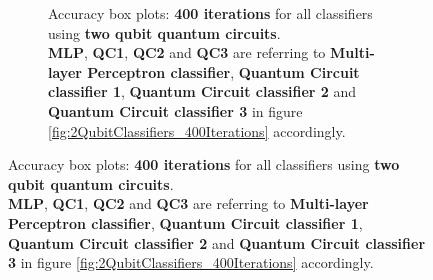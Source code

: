 \begin{figure}[!h]
\begin{subfigure}{1.0\textwidth}
\begin{subfigure}{1.0\textwidth}
{            }
        \end{subfigure}
        \begin{subfigure}{1.0\textwidth}
            \centering
        \end{subfigure}
        \begin{subfigure}{1.0\textwidth}
            \centering
        \end{subfigure}
        \caption{Accuracy box plots: \textbf{400 iterations} for all classifiers using \textbf{two qubit quantum circuits}.\\ \textbf{MLP}, \textbf{QC1}, \textbf{QC2} and \textbf{QC3} are referring to \textbf{Multi-layer Perceptron classifier}, \textbf{Quantum Circuit classifier 1}, \textbf{Quantum Circuit classifier 2} and \textbf{Quantum Circuit classifier 3} in figure \ref{fig:2QubitClassifiers_400Iterations} accordingly.}
        \label{fig:2QubitClassifiers_400Iterations_boxplot}
    \end{subfigure}
\end{figure}

